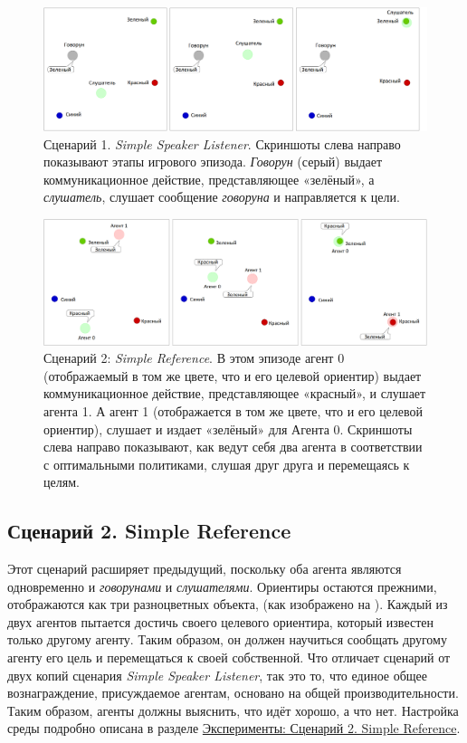 \begin{figure}[ht!] 
	\center
	\includegraphics [scale=0.41] {my_folder/images/fig0-1-simple-speaker-listener.png}
	\caption{Сценарий 1. \textit{Simple Speaker Listener}. Скриншоты слева направо показывают этапы игрового эпизода. \textit{Говорун} (серый) выдает коммуникационное действие, представляющее «зелёный», а \textit{слушатель}, слушает сообщение \textit{говоруна} и направляется к цели.}
	\label{fig:0-1-simple-speaker-listener}  
\end{figure}

\begin{figure}[ht!] 
	\center
	\includegraphics [scale=0.38] {my_folder/images/fig0-2-simple-reference.png}
	\caption{Сценарий 2: \textit{Simple Reference}. В этом эпизоде агент 0 (отображаемый в том же цвете, что и его целевой ориентир) выдает коммуникационное действие, представляющее «красный», и слушает агента 1. А агент 1 (отображается в том же цвете, что и его целевой ориентир), слушает и издает «зелёный» для Агента 0. Скриншоты слева направо показывают, как ведут себя два агента в соответствии с оптимальными политиками, слушая друг друга и перемещаясь к целям.}
	\label{fig:0-1-simple-reference}  
\end{figure}

\subsection{Сценарий 2. Simple Reference} \label{intro-sr}

Этот сценарий расширяет предыдущий, поскольку оба агента являются одновременно и \textit{говорунами} и \textit{слушателями}. Ориентиры остаются прежними, отображаются как три разноцветных объекта, (как изображено на ). Каждый из двух агентов пытается достичь своего целевого ориентира, который известен только другому агенту. Таким образом, он должен научиться сообщать другому агенту его цель и перемещаться к своей собственной. Что отличает сценарий от двух копий сценария \textit{Simple Speaker Listener}, так это то, что единое общее вознаграждение, присуждаемое агентам, основано на общей производительности. Таким образом, агенты должны выяснить, что идёт хорошо, а что нет. Настройка среды подробно описана в разделе \hyperref[exp-sr]{Эксперименты: Сценарий 2. Simple Reference}.

